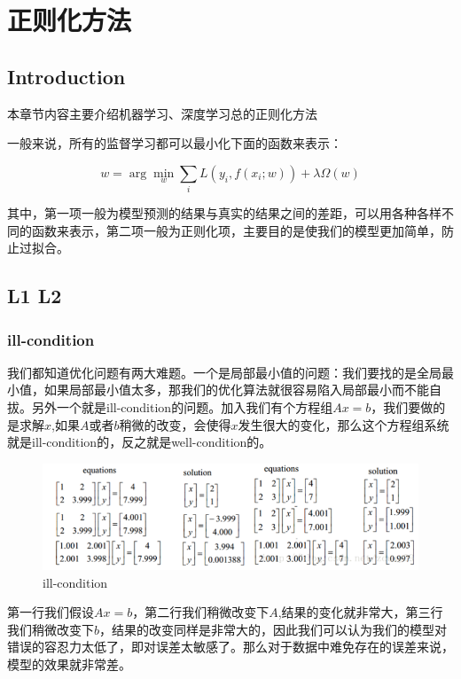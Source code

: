 \chapter{正则化方法}

\section*{Introduction}
	本章节内容主要介绍机器学习、深度学习总的正则化方法
	
	一般来说，所有的监督学习都可以最小化下面的函数来表示：
	
	\begin{equation}
		w = \arg \min_{w} \sum_{i}L(y_i,f(x_i;w)) + \lambda \Omega(w)
	\end{equation}
	
	其中，第一项一般为模型预测的结果与真实的结果之间的差距，可以用各种各样不同的函数来表示，第二项一般为正则化项，主要目的是使我们的模型更加简单，防止过拟合。

\section{L1 L2}
	\boldmath  %
	
	\subsection{ill-condition}
	我们都知道优化问题有两大难题。一个是局部最小值的问题：我们要找的是全局最小值，如果局部最小值太多，那我们的优化算法就很容易陷入局部最小而不能自拔。另外一个就是ill-condition的问题。加入我们有个方程组$Ax=b$，我们要做的是求解$x$,如果$A$或者$b$稍微的改变，会使得$x$发生很大的变化，那么这个方程组系统就是ill-condition的，反之就是well-condition的。
	
	\begin{figure}[htbp]
	\centering\includegraphics[width=6in]{img/3-1.png}
	\caption{ill-condition}\label{fig:3-1}
	\end{figure}
	
	第一行我们假设$Ax=b$，第二行我们稍微改变下$A$,结果的变化就非常大，第三行我们稍微改变下$b$，结果的改变同样是非常大的，因此我们可以认为我们的模型对错误的容忍力太低了，即对误差太敏感了。那么对于数据中难免存在的误差来说，模型的效果就非常差。
	
